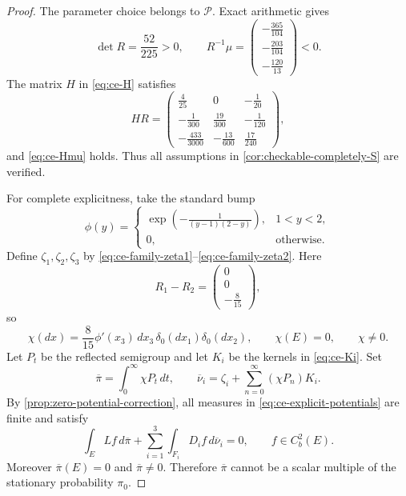 \documentclass[aihp]{imsart}
\numberwithin{equation}{section}
\theoremstyle{plain}
\theoremstyle{definition}
\newcommand{\1}{\mathbf 1}
\begin{document}
\begin{proof}
The parameter choice belongs to $\mathcal P$. Exact arithmetic gives
\begin{equation}\label{eq:ce-explicit-certificates}
 \det R=\frac{52}{225}>0,
 \qquad
 R^{-1}\mu=
 \begin{pmatrix}
 -\frac{365}{104}\\[1mm]
 -\frac{203}{104}\\[1mm]
 -\frac{120}{13}
 \end{pmatrix}<0.
\end{equation}
The matrix $H$ in \eqref{eq:ce-H} satisfies
\begin{equation}\label{eq:ce-explicit-HR}
HR=
\begin{pmatrix}
\frac4{25}&0&-\frac1{20}\\[1mm]
-\frac1{300}&\frac{19}{300}&-\frac1{120}\\[1mm]
-\frac{433}{3000}&-\frac{13}{600}&\frac{17}{240}
\end{pmatrix},
\end{equation}
and \eqref{eq:ce-Hmu} holds. Thus all assumptions in \cref{cor:checkable-completely-S} are verified.

For complete explicitness, take the standard bump
\begin{equation}\label{eq:ce-bump}
\phi(y)=
\begin{cases}
\displaystyle
\exp\!\left(-\frac{1}{(y-1)(2-y)}\right),&1<y<2,\\[2mm]
0,&\text{otherwise}.
\end{cases}
\end{equation}
Define $\zeta_1,\zeta_2,\zeta_3$ by \eqref{eq:ce-family-zeta1}--\eqref{eq:ce-family-zeta2}. Here
\[
 R_1-R_2=
 \begin{pmatrix}0\\0\\-\frac8{15}\end{pmatrix},
\]
so
\begin{equation}\label{eq:ce-explicit-source}
 \chi(dx)=\frac8{15}\phi'(x_3)\,dx_3\,
          \delta_0(dx_1)\delta_0(dx_2),
 \qquad
 \chi(E)=0,
 \qquad
 \chi\ne0.
\end{equation}
Let $P_t$ be the reflected semigroup and let $K_i$ be the kernels in \eqref{eq:ce-Ki}. Set
\begin{equation}\label{eq:ce-explicit-potentials}
 \overline\pi=\int_0^\infty\chi P_t\,dt,
 \qquad
 \overline\nu_i=\zeta_i+\sum_{n=0}^\infty(\chi P_n)K_i.
\end{equation}
By \cref{prop:zero-potential-correction}, all measures in \eqref{eq:ce-explicit-potentials} are finite and satisfy
\[
 \int_E Lf\,d\overline\pi
 +\sum_{i=1}^3\int_{F_i}D_i f\,d\overline\nu_i=0,
 \qquad f\in C_b^2(E).
\]
Moreover $\overline\pi(E)=0$ and $\overline\pi\ne0$. Therefore $\overline\pi$ cannot be a scalar multiple of the stationary probability $\pi_0$.
\end{proof}
\end{document}

